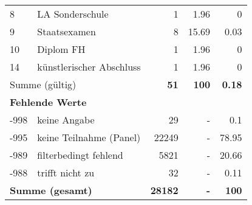 \begin{longtable}{lXrrr}
     8 &
     \multicolumn{1}{X}{ LA Sonderschule   } &


       \num{1} &
       \num[round-mode=places,round-precision=2]{1.96} &
         \num[round-mode=places,round-precision=2]{0} \\

     9 &
     \multicolumn{1}{X}{ Staatsexamen   } &


       \num{8} &
       \num[round-mode=places,round-precision=2]{15.69} &
         \num[round-mode=places,round-precision=2]{0.03} \\

     10 &
     \multicolumn{1}{X}{ Diplom FH   } &


       \num{1} &
       \num[round-mode=places,round-precision=2]{1.96} &
         \num[round-mode=places,round-precision=2]{0} \\

     14 &
     \multicolumn{1}{X}{ künstlerischer Abschluss   } &


       \num{1} &
       \num[round-mode=places,round-precision=2]{1.96} &
         \num[round-mode=places,round-precision=2]{0} \\
     \midrule
     \multicolumn{2}{l}{Summe (gültig)} &
       \textbf{\num{51}} &
     \textbf{\num{100}} &
       \textbf{\num[round-mode=places,round-precision=2]{0.18}} \\
     \multicolumn{5}{l}{\textbf{Fehlende Werte}}\\
       -998 &
       keine Angabe &
         \num{29} &
        - &
         \num[round-mode=places,round-precision=2]{0.1} \\
       -995 &
       keine Teilnahme (Panel) &
         \num{22249} &
        - &
         \num[round-mode=places,round-precision=2]{78.95} \\
       -989 &
       filterbedingt fehlend &
         \num{5821} &
        - &
         \num[round-mode=places,round-precision=2]{20.66} \\
       -988 &
       trifft nicht zu &
         \num{32} &
        - &
         \num[round-mode=places,round-precision=2]{0.11} \\
     \midrule
     \multicolumn{2}{l}{\textbf{Summe (gesamt)}} &
          \textbf{\num{28182}} &
        \textbf{-} &
        \textbf{\num{100}} \\
     \bottomrule
     \end{longtable}
     
